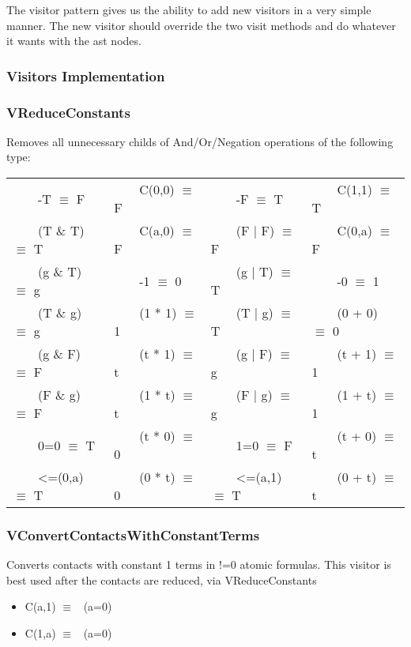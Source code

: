 \documentclass{article}
\newcommand{\tabitem}{~~\llap{\textbullet}~~}
\begin{document}
				The visitor pattern gives us the ability to add new visitors in a very simple manner.
				The new visitor should override the two visit methods and do whatever it wants with the ast nodes.


			\subsubsection*{Visitors Implementation}
				\subsubsection*{VReduceConstants}
					Removes all unnecessary childs of And/Or/Negation operations of the following type:

					\begin{table}[H]
					  \centering
					  \begin{tabular}{llll}
					    \toprule
					    \midrule
					\tabitem -T $\equiv$ F & \tabitem C(0,0)  $\equiv$ F & \tabitem -F $\equiv$ T & \tabitem C(1,1) $\equiv$ T \\
					\tabitem (T \& T) $\equiv$ T & \tabitem C(a,0)  $\equiv$ F & \tabitem (F | F) $\equiv$ F & \tabitem C(0,a) $\equiv$ F \\
					\tabitem (g \& T) $\equiv$ g & \tabitem -1 $\equiv$ 0 & \tabitem (g | T) $\equiv$ T & \tabitem -0 $\equiv$ 1 \\
					\tabitem (T \& g) $\equiv$ g & \tabitem (1 * 1) $\equiv$ 1 & \tabitem (T | g) $\equiv$ T & \tabitem (0 + 0) $\equiv$ 0 \\
					\tabitem (g \& F) $\equiv$ F & \tabitem (t * 1) $\equiv$ t & \tabitem (g | F) $\equiv$ g & \tabitem (t + 1) $\equiv$ 1 \\
					\tabitem (F \& g) $\equiv$ F & \tabitem (1 * t) $\equiv$ t & \tabitem (F | g) $\equiv$ g & \tabitem (1 + t) $\equiv$ 1 \\
					\tabitem 0=0 $\equiv$ T & \tabitem (t * 0) $\equiv$ 0 & \tabitem 1=0 $\equiv$ F & \tabitem (t + 0) $\equiv$ t \\
					\tabitem <=(0,a) $\equiv$ T & \tabitem (0 * t) $\equiv$ 0 & \tabitem <=(a,1) $\equiv$ T & \tabitem (0 + t) $\equiv$ t \\

					    \bottomrule
					  \end{tabular}
					\end{table}
				\subsubsection*{VConvertContactsWithConstantTerms}
					Converts contacts with constant 1 terms in !=0 atomic formulas. 
					This visitor is best used after the contacts are reduced, via VReduceConstants
					\begin{itemize}
						\item C(a,1) $\equiv$ ~(a=0)  
						\item C(1,a) $\equiv$ ~(a=0)
					\end{itemize}
\end{document}
